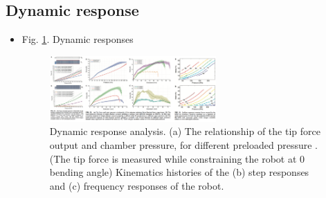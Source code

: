 \documentclass[journal,onecolumn]{IEEEtran}
\begin{document}
\subsection{Dynamic response}
\label{sec:org48a5000}
\begin{itemize}
\item Fig. \ref{fig:orgecf1a7b}. Dynamic responses

\begin{figure}[!h]
\centering
\includegraphics[width=0.6\textwidth]{./fig/fig-dynamic_response.png}
\caption{\label{fig:orgecf1a7b}
Dynamic response analysis. (a) The relationship of the tip force output and chamber pressure, for different preloaded pressure . (The tip force is measured while constraining the robot at 0 bending angle) Kinematics histories of the (b) step responses and (c) frequency responses of the robot.}
\end{figure}


\end{itemize}
\end{document}
